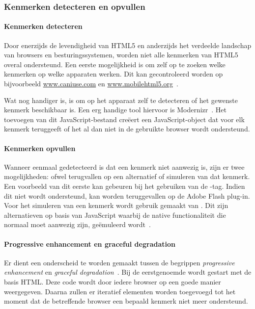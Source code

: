 \subsubsection{Kenmerken detecteren en opvullen}
\paragraph{Kenmerken detecteren}
Door enerzijds de levendigheid van HTML5 en anderzijds het verdeelde landschap van browsers en besturingssystemen, worden niet alle kenmerken van HTML5 overal ondersteund. 
Een eerste mogelijkheid is om zelf op te zoeken welke kenmerken op welke apparaten werken. 
Dit kan gecontroleerd worden op bijvoorbeeld \url{www.caniuse.com} en \url{www.mobilehtml5.org}~\cite{MacDonald2011}. 

Wat nog handiger is, is om op het apparaat zelf te detecteren of het gewenste kenmerk beschikbaar is. 
Een erg handige tool hiervoor is Modernizr~\cite{Modernizr2012}. 
Het toevoegen van dit JavaScript-bestand creëert een JavaScript-object dat voor elk kenmerk teruggeeft of het al dan niet in de gebruikte browser wordt ondersteund.

\paragraph{Kenmerken opvullen}
Wanneer eenmaal gedetecteerd is dat een kenmerk niet aanwezig is, zijn er twee mogelijkheden: ofwel terugvallen op een alternatief of simuleren van dat kenmerk. 
Een voorbeeld van dit eerste kan gebeuren bij het gebruiken van de -tag. 
Indien dit niet wordt ondersteund, kan worden teruggevallen op de Adobe Flash plug-in. 
Voor het simuleren van een kenmerk wordt gebruik gemaakt van . 
Dit zijn alternatieven op basis van JavaScript waarbij de native functionaliteit die normaal moet aanwezig zijn, geëmuleerd wordt~\cite{MacDonald2011,Weyl2011}.

\paragraph{Progressive enhancement en graceful degradation}
\label{par:progressive-enhancement}
Er dient een onderscheid te worden gemaakt tussen de begrippen \emph{progressive enhancement} en \emph{graceful degradation}~\cite{Hens2012}. 
Bij de eerstgenoemde wordt gestart met de basis HTML.
Deze code wordt door iedere browser op een goede manier weergegeven. 
Daarna zullen er iteratief elementen worden toegevoegd tot het moment dat de betreffende browser een bepaald kenmerk niet meer ondersteund.

